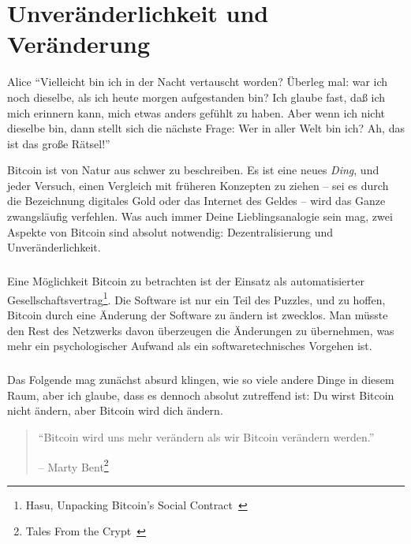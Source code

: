 \chapter{Unveränderlichkeit und Veränderung}
\label{les:1}

\begin{chapquote}{Alice}
\enquote{Vielleicht bin ich in der Nacht vertauscht worden? Überleg mal: war ich
noch dieselbe, als ich heute morgen aufgestanden bin? Ich glaube fast, daß ich
mich erinnern kann, mich etwas anders gefühlt zu haben. Aber wenn ich nicht
dieselbe bin, dann stellt sich die nächste Frage: Wer in aller Welt bin ich? Ah,
das ist das große Rätsel!}
\end{chapquote}

Bitcoin ist von Natur aus schwer zu beschreiben. Es ist eine neues
\textit{Ding}, und jeder Versuch, einen Vergleich mit früheren Konzepten zu
ziehen – sei es durch die Bezeichnung digitales Gold oder das Internet des
Geldes – wird das Ganze zwangsläufig verfehlen. Was auch immer Deine
Lieblingsanalogie sein mag, zwei Aspekte von Bitcoin sind absolut notwendig:
Dezentralisierung und Unveränderlichkeit.

\paragraph{}
Eine Möglichkeit Bitcoin zu betrachten ist der Einsatz als automatisierter
Gesellschaftsvertrag\footnote{Hasu, Unpacking Bitcoin's Social
Contract~\cite{social-contract}}. Die Software ist nur ein Teil des Puzzles, und
zu hoffen, Bitcoin durch eine Änderung der Software zu ändern ist zwecklos. Man
müsste den Rest des Netzwerks davon überzeugen die Änderungen zu übernehmen, was
mehr ein psychologischer Aufwand als ein softwaretechnisches Vorgehen ist.

\paragraph{}
Das Folgende mag zunächst absurd klingen, wie so viele andere Dinge in diesem
Raum, aber ich glaube, dass es dennoch absolut zutreffend ist: Du wirst Bitcoin
nicht ändern, aber Bitcoin wird dich ändern.

\begin{quotation}\begin{samepage}
\enquote{Bitcoin wird uns mehr verändern als wir Bitcoin verändern werden.}
\begin{flushright} -- Marty Bent\footnote{Tales From the Crypt~\cite{tftc21}}
\end{flushright}\end{samepage}\end{quotation}


